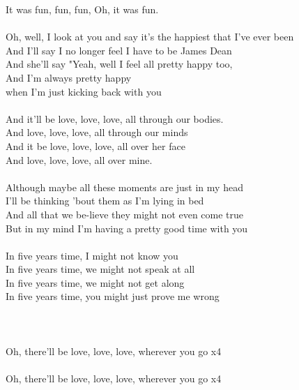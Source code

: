 It was  fun, fun,  fun,  Oh, it was  fun.\\
                              \\
Oh, well, I  look at you and  say it's the happiest that  I've ever  been\\
And I'll say  I no longer  feel I have to  be James  Dean\\
And she'll say  "Yeah, well I  feel all  pretty happy  too,\\
And I'm  always pretty  happy\\
when I'm just  kicking back with  you\\
\\
And it'll be  love, love,  love,  all through our  bodies.\\
And  love, love,  love,  all through our  minds\\
And it be  love, love,  love,  all over her  face\\
And  love, love,  love,  all over  mine.\\
\\
Although  maybe all these  moments are  just in my  head\\
I'll be  thinking 'bout  them as I'm  lying in  bed\\
And  all that we be-lieve they might not  even come  true\\
But in my  mind I'm  having a pretty good  time with  you\\
\\
In  five years  time,  I might not  know you\\
In  five years  time,  we might not  speak at all\\
In  five years  time,  we might not  get along\\
In  five years  time,  you might just  prove me  wrong\\
\\
                              \\
\\
Oh, there'll be  love, love,  love,  wherever  you go  x4\\
\\
Oh, there'll be  love, love,  love,  wherever  you go  x4\\
